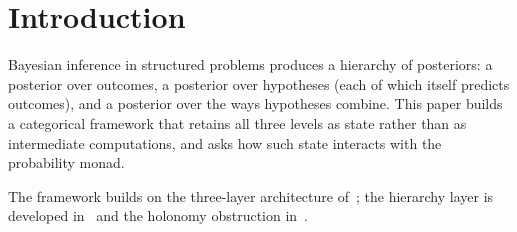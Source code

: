 \documentclass[11pt]{article}
\theoremstyle{definition}
\theoremstyle{remark}
\begin{document}
\begin{abstract}
with convex spaces over it, and we make precise that the ambient 2-category is $\mathbf{Cat}$, in which
these categories are locally discrete, so two-dimensional monad theory adds no content here. We then
test the natural relaxation of the absolute tower by the convex order: the unit and multiplication
defects of the shift law are comparable but in opposite orientations relative to the Beck diagrams,
and the comultiplication defect is incomparable, for both candidate laws. The naive convex-order
relaxation therefore fails, which motivates an enrichment that compares coherent lifts rather than
barycentric spreads. On the
algebraic side we give a normalized partial composition on structured posteriors, corrected
conditioning laws, an exact characterization of when observational equivalence is a congruence, and
a proof that the likelihood-factorization ``iff'' holds under nondegeneracy alone. All identities and
counterexamples were checked in exact rational arithmetic; the scripts are in the accompanying
repository.
\end{abstract}

\tableofcontents

\section{Introduction}

Bayesian inference in structured problems produces a hierarchy of posteriors: a posterior over
outcomes, a posterior over hypotheses (each of which itself predicts outcomes), and a posterior over
the ways hypotheses combine. This paper builds a categorical framework that retains all three levels
as state rather than as intermediate computations, and asks how such state interacts with the
probability monad.

The framework builds on the three-layer architecture of~\cite{Awasthi-ThreeLayers}; the hierarchy
layer is developed in~\cite{Awasthi-Hierarchy} and the holonomy obstruction
in~\cite{Awasthi-Holonomy}.
\end{document}
